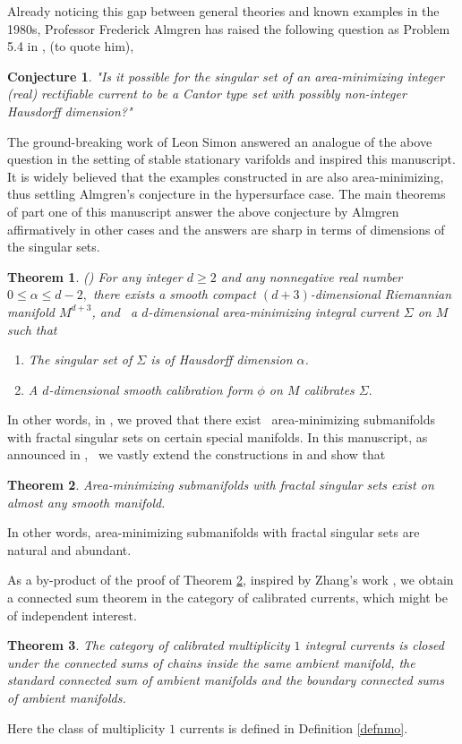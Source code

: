 \documentclass[11pt,a4paper]{amsart}
\numberwithin{equation}{section}
\newcommand{\ai}{\alpha}
\newcommand{\Si}{\Sigma}
\theoremstyle{plain}
\newtheorem{thm}{Theorem}
\theoremstyle{definition}
\newtheorem{conj}{Conjecture}
\numberwithin{equation}{subsection}
\begin{document}
	
	Already noticing this gap between general theories and known examples in the 1980s, Professor Frederick Almgren has raised the following question as Problem 5.4 in \cite{GMT}, (to quote him), 
	\begin{conj}\label{ca}
		\emph{"Is it possible for the singular set of an area-minimizing integer (real) rectifiable current to be a Cantor type set with possibly non-integer Hausdorff dimension?"}
	\end{conj}
	The ground-breaking work of Leon Simon \cite{LSfr} answered an analogue of the above question in the setting of stable stationary varifolds and inspired this manuscript. It is widely believed that the examples constructed in \cite{LSfr} are also area-minimizing, thus settling Almgren's conjecture in the hypersurface case. The main theorems of part one of this manuscript \cite{ZLa} answer the above conjecture by Almgren affirmatively in other cases and the answers are sharp in terms of dimensions of the singular sets.
	\begin{thm}\label{thmd}(\cite{ZLa})
		For any integer $d\ge 2$ and any nonnegative real number $0\le\ai\le d-2,$ there exists a smooth compact $(d+3)$-dimensional Riemannian manifold $M^{d+3}$, and  a $d$-dimensional area-minimizing integral current $\Si$ on $M$ such that
		\begin{enumerate}
			\item The singular set of $\Si$ is of Hausdorff dimension $\ai$.
			\item A $d$-dimensional smooth calibration form $\phi$ on $M$ calibrates $\Si.$
		\end{enumerate}
	\end{thm}
	In other words, in \cite{ZLa}, we proved that there exist  area-minimizing submanifolds with fractal singular sets on certain special manifolds. In this manuscript, as announced in \cite[Section 5.6]{ZLa},  we vastly extend the constructions in \cite{ZLa} and show that 
	\begin{thm}\label{thma}
		Area-minimizing submanifolds with fractal singular sets exist on almost any smooth manifold. 
	\end{thm}
	In other words, area-minimizing submanifolds with fractal singular sets are natural and abundant.
	
	As a by-product of the proof of Theorem \ref{thma}, inspired by Zhang's work \cite{YZa,YZj,YZt}, we obtain a connected sum theorem in the category of calibrated currents, which might be of independent interest.
	\begin{thm}\label{thmcs}
		The category of calibrated multiplicity $1$ integral currents is closed under the connected sums of chains inside the same ambient manifold, the standard connected sum of ambient manifolds and the boundary connected sums of ambient manifolds. 
	\end{thm}
	Here the class of multiplicity $1$ currents \cite{LScy} is defined in Definition \ref{defnmo}.
	
\end{document}

